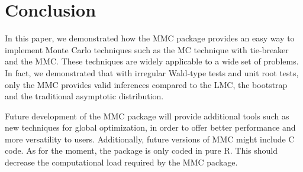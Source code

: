 \documentclass[]{article}\usepackage[]{graphicx}\usepackage[]{color}
\newcommand{\pkg}[1]{{\normalfont\fontseries{b}\selectfont #1}}
\let\proglang=\textsf
\begin{document}
\section{Conclusion}

In this paper, we demonstrated how the \pkg{MMC} package provides an easy way to implement Monte Carlo techniques such as the MC technique with tie-breaker and the MMC. These techniques are widely applicable to a wide set of problems. In fact, we demonstrated that with irregular Wald-type tests and unit root tests, only the MMC provides valid inferences compared to the LMC, the bootstrap and the traditional asymptotic distribution.

Future development of the \pkg{MMC} package will provide additional tools such as new techniques for global optimization, in order to offer better performance and more versatility to users. Additionally, future versions of \pkg{MMC} might include \proglang{C} code. As for the moment, the package is only coded in pure \proglang{R}. This should decrease the computational load required by the \pkg{MMC} package.


\clearpage

\printbibliography
\end{document}

